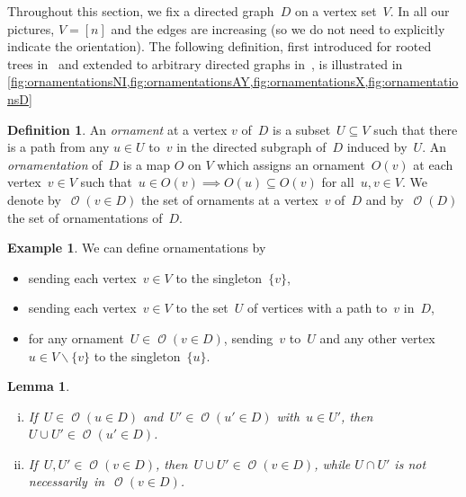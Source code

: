 \documentclass{amsart}
\newtheorem{lemma}[theorem]{Lemma}
\theoremstyle{definition}
\newtheorem{definition}[theorem]{Definition}
\newtheorem{example}[theorem]{Example}
\renewcommand{\c}[1]{\mathcal{#1}} %
\newcommand{\ssm}{\smallsetminus} %
\newcommand{\darkblue}{\color{darkblue}} %
\newcommand{\defn}[1]{\textsl{\darkblue #1}} %
\DeclareMathOperator{\Orn}{\c{O}}  %
\begin{document}
Throughout this section, we fix a directed graph~$D$ on a vertex set~$V$.
In all our pictures, $V = [n]$ and the edges are increasing (so we do not need to explicitly indicate the orientation).
The following definition, first introduced for rooted trees in~\cite{} and extended to arbitrary directed graphs in~\cite{}, is illustrated in \cref{fig:ornamentationsNI,fig:ornamentationsAY,fig:ornamentationsX,fig:ornamentationsD}

\begin{definition}
An \defn{ornament} at a vertex $v$ of~$D$ is a subset~$U \subseteq V$ such that there is a path from any $u \in U$ to~$v$ in the directed subgraph of~$D$ induced by~$U$.
An \defn{ornamentation} of~$D$ is a map $O$ on $V$ which assigns an ornament~$O(v)$ at each vertex~$v \in V$ such that~$u \in O(v) \implies O(u) \subseteq O(v)$ for all~$u,v \in V$.
We denote by~$\Orn(v \in D)$ the set of ornaments at a vertex~$v$ of~$D$ and by~$\Orn(D)$ the set of ornamentations of~$D$.
\end{definition}

\begin{example}
We can define ornamentations by
\begin{itemize}
\item sending each vertex~$v \in V$ to the singleton~$\{v\}$, 
\item sending each vertex~$v \in V$ to the set~$U$ of vertices with a path to~$v$ in~$D$,
\item for any ornament~$U \in \Orn(v \in D)$, sending~$v$ to~$U$ and any other vertex~$u \in V \ssm \{v\}$ to the singleton~$\{u\}$.
\end{itemize}
\end{example}

\begin{lemma}
\label{lem:unionOrnaments}
\begin{enumerate}[(i)]
\item If~$U \in \Orn(u \in D)$ and~$U' \in \Orn(u' \in D)$ with~$u \in U'$, then~${U \cup U' \in \Orn(u' \in D)}$.
\item If~$U,U' \in \Orn(v \in D)$, then~$U \cup U' \in \Orn(v \in D)$, while $U \cap U'$ is not necessarily~in~${\Orn(v \in D)}$.
\end{enumerate}
\end{lemma}
\end{document}
